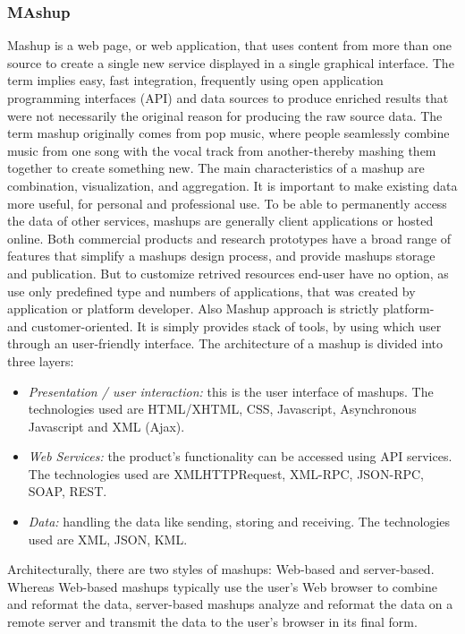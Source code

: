 	\subsubsection{MAshup}
		Mashup is a web page, or web application, that uses content from more than one source to create a single new service displayed in a single graphical interface. The term implies easy, fast integration, frequently using open application programming interfaces (API) and data sources to produce enriched results that were not necessarily the original reason for producing the raw source data. The term mashup originally comes from pop music, where people seamlessly combine music from one song with the vocal track from another-thereby mashing them together to create something new. The main characteristics of a mashup are combination, visualization, and aggregation. It is important to make existing data more useful, for personal and professional use. To be able to permanently access the data of other services, mashups are generally client applications or hosted online. Both commercial products and research prototypes have a broad range of features that simplify a mashups design process, and provide mashups storage and publication. But to customize retrived resources end-user have no option, as use only predefined type and numbers of applications, that was created by application or platform developer. Also Mashup approach is strictly platform- and customer-oriented. It is simply provides stack of tools, by using which user through an user-friendly interface. The architecture of a mashup is divided into three layers:
 \newline
 \begin{itemize}
\item \emph {Presentation / user interaction:} this is the user interface of mashups. The technologies used are HTML/XHTML, CSS, Javascript, Asynchronous Javascript and XML (Ajax).
 \newline
\item \emph {Web Services:} the product's functionality can be accessed using API services. The technologies used are XMLHTTPRequest, XML-RPC, JSON-RPC, SOAP, REST.
 \newline
\item \emph {Data:} handling the data like sending, storing and receiving. The technologies used are XML, JSON, KML.
 \newline
 \end{itemize}
Architecturally, there are two styles of mashups: Web-based and server-based. Whereas Web-based mashups typically use the user's Web browser to combine and reformat the data, server-based mashups analyze and reformat the data on a remote server and transmit the data to the user's browser in its final form\cite{bolin2005end}.
